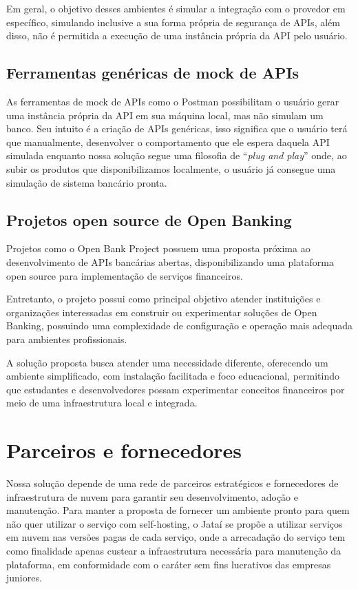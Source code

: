 \documentclass[
  12pt,
  openright,
  oneside,
  a4paper,
  brazilian
]{abntex2}
\begin{document}
Em geral, o objetivo desses ambientes é simular a integração com o provedor em específico, simulando inclusive a sua forma própria de segurança de APIs, além disso, não é permitida a execução de uma instância própria da API pelo usuário.

\subsection{Ferramentas genéricas de mock de APIs}
As ferramentas de mock de APIs como o Postman \parencite{postmanMockDoc} possibilitam o usuário gerar uma instância própria da API em sua máquina local, mas não simulam um banco. Seu intuito é a criação de APIs genéricas, isso significa que o usuário terá que manualmente, desenvolver o comportamento que ele espera daquela API simulada enquanto nossa solução segue uma filosofia de ``\textit{plug and play}'' onde, ao subir os produtos que disponibilizamos localmente, o usuário já consegue uma simulação de sistema bancário pronta.

\subsection{Projetos open source de Open Banking}
Projetos como o Open Bank Project \parencite{opbApi} possuem uma proposta próxima ao desenvolvimento de APIs bancárias abertas, disponibilizando uma plataforma open source para implementação de serviços financeiros.

Entretanto, o projeto possui como principal objetivo atender instituições e organizações interessadas em construir ou experimentar soluções de Open Banking, possuindo uma complexidade de configuração e operação mais adequada para ambientes profissionais.

A solução proposta busca atender uma necessidade diferente, oferecendo um ambiente simplificado, com instalação facilitada e foco educacional, permitindo que estudantes e desenvolvedores possam experimentar conceitos financeiros por meio de uma infraestrutura local e integrada.

\section{Parceiros e fornecedores}
Nossa solução depende de uma rede de parceiros estratégicos e fornecedores de infraestrutura de nuvem para garantir seu desenvolvimento, adoção e manutenção. Para manter a proposta de fornecer um ambiente pronto para quem não quer utilizar o serviço com self-hosting, o Jataí se propõe a utilizar serviços em nuvem nas versões pagas de cada serviço, onde a arrecadação do serviço tem como finalidade apenas custear a infraestrutura necessária para manutenção da plataforma, em conformidade com o caráter sem fins lucrativos das empresas juniores.
\end{document}
